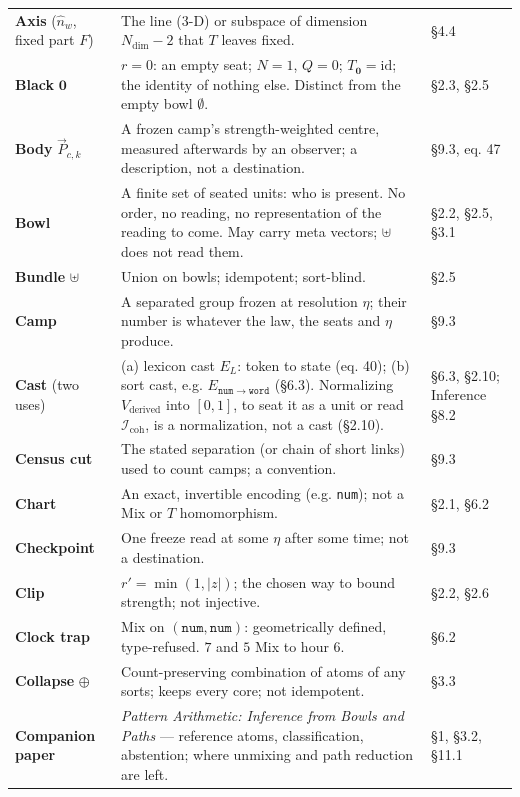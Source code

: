 \documentclass[10.5pt]{article}
\begin{document}
{\begin{longtable}{L{3.6cm}L{10.9cm}L{1.8cm}}
\textbf{Axis} ($\hat n_w$, fixed part $F$) & The line (3-D) or subspace of dimension $N_{\mathrm{dim}}-2$ that $T$ leaves fixed. & §4.4 \\
\textbf{Black} $\mathbf0$ & $r=0$: an empty seat; $N=1$, $Q=0$; $T_{\mathbf0}=\mathrm{id}$; the identity of nothing else. Distinct from the empty bowl $\emptyset$. & §2.3, §2.5 \\
\textbf{Body} $\vec P_{c,k}$ & A frozen camp's strength-weighted centre, measured afterwards by an observer; a description, not a destination. & §9.3, eq. 47 \\
\textbf{Bowl} & A finite set of seated units: who is present. No order, no reading, no representation of the reading to come. May carry meta vectors; $\uplus$ does not read them. & §2.2, §2.5, §3.1 \\
\textbf{Bundle} $\uplus$ & Union on bowls; idempotent; sort-blind. & §2.5 \\
\textbf{Camp} & A separated group frozen at resolution $\eta$; their number is whatever the law, the seats and $\eta$ produce. & §9.3 \\
\textbf{Cast} (two uses) & (a) lexicon cast $E_L$: token to state (eq. 40); (b) sort cast, e.g. $E_{\mathtt{num}\to\mathtt{word}}$ (§6.3). Normalizing $V_{\text{derived}}$ into $[0,1]$, to seat it as a unit or read $\mathcal{I}_{\mathrm{coh}}$, is a normalization, not a cast (§2.10). & §6.3, §2.10; Inference §8.2 \\
\textbf{Census cut} & The stated separation (or chain of short links) used to count camps; a convention. & §9.3 \\
\textbf{Chart} & An exact, invertible encoding (e.g. \texttt{num}); not a Mix or $T$ homomorphism. & §2.1, §6.2 \\
\textbf{Checkpoint} & One freeze read at some $\eta$ after some time; not a destination. & §9.3 \\
\textbf{Clip} & $r'=\min(1,\lvert z\rvert)$; the chosen way to bound strength; not injective. & §2.2, §2.6 \\
\textbf{Clock trap} & Mix on $(\mathtt{num},\mathtt{num})$: geometrically defined, type-refused. $7$ and $5$ Mix to hour $6$. & §6.2 \\
\textbf{Collapse} $\oplus$ & Count-preserving combination of atoms of any sorts; keeps every core; not idempotent. & §3.3 \\
\textbf{Companion paper} & \emph{Pattern Arithmetic: Inference from Bowls and Paths} — reference atoms, classification, abstention; where unmixing and path reduction are left. & §1, §3.2, §11.1 \\

\end{longtable}}
\end{document}
